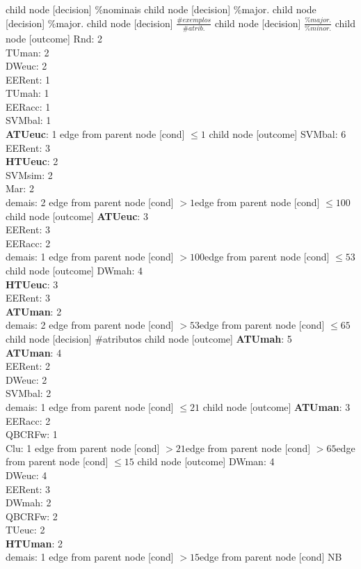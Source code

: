child {node [decision] {\%nominais}
child {node [decision] {\%major.}
child {node [decision] {\%major.}
child {node [decision] {$\frac{\#exemplos}{\#atrib.}$}
child {node [decision] {$\frac{\%major.}{\%minor.}$}
child {node [outcome] {Rnd: 2\\
TUman: 2\\
DWeuc: 2\\
EERent: 1\\
TUmah: 1\\
EERacc: 1\\
SVMbal: 1\\
\textbf{ATUeuc}: 1} edge from parent node [cond] {$\leq1$}}
child {node [outcome] {SVMbal: 6\\
EERent: 3\\
\textbf{HTUeuc}: 2\\
SVMsim: 2\\
Mar: 2\\
demais: 2} edge from parent node [cond] {$>1$}}edge from parent node [cond] {$\leq100$}}
child {node [outcome] {\textbf{ATUeuc}: 3\\
EERent: 3\\
EERacc: 2\\
demais: 1} edge from parent node [cond] {$>100$}}edge from parent node [cond] {$\leq53$}}
child {node [outcome] {DWmah: 4\\
\textbf{HTUeuc}: 3\\
EERent: 3\\
\textbf{ATUman}: 2\\
demais: 2} edge from parent node [cond] {$>53$}}edge from parent node [cond] {$\leq65$}}
child {node [decision] {\#atributos}
child {node [outcome] {\textbf{ATUmah}: 5\\
\textbf{ATUman}: 4\\
EERent: 2\\
DWeuc: 2\\
SVMbal: 2\\
demais: 1} edge from parent node [cond] {$\leq21$}}
child {node [outcome] {\textbf{ATUman}: 3\\
EERacc: 2\\
QBCRFw: 1\\
Clu: 1} edge from parent node [cond] {$>21$}}edge from parent node [cond] {$>65$}}edge from parent node [cond] {$\leq15$}}
child {node [outcome] {DWman: 4\\
DWeuc: 4\\
EERent: 3\\
DWmah: 2\\
QBCRFw: 2\\
TUeuc: 2\\
\textbf{HTUman}: 2\\
demais: 1} edge from parent node [cond] {$>15$}}edge from parent node [cond] {NB}}
